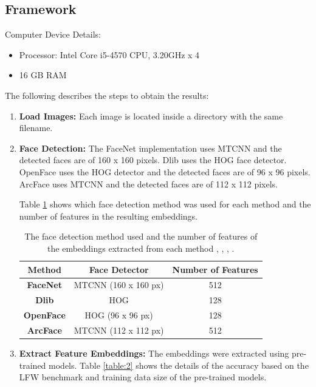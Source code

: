 \documentclass[12pt,english]{article}
\begin{document}
\subsection{Framework}
\quad
Computer Device Details:
\begin{itemize}
\item Processor: Intel Core i5-4570 CPU, 3.20GHz x 4
\item 16 GB RAM
\end{itemize}

The following describes the steps to obtain the results:

\begin{enumerate}
\item \textbf{Load Images: } Each image is located inside a directory with the same filename.
\item \textbf{Face Detection: } The FaceNet implementation uses MTCNN and the detected faces are of 160 x 160 pixels. Dlib uses the HOG face detector. OpenFace uses the HOG detector and the detected faces are of 96 x 96 pixels. ArcFace uses MTCNN and the detected faces are of 112 x 112 pixels.

Table \ref{table:1} shows which face detection method was used for each method and the number of features in the resulting embeddings.

\begin{table}[H]
\centering
\begin{tabular}{||c c c||} 
 \hline
  Method & Face Detector & Number of Features\\ [0.5ex]
 \hline\hline
 \textbf{FaceNet} & MTCNN (160 x 160 px) & 512\\ 
 \hline
 \textbf{Dlib} & HOG & 128\\
 \hline
 \textbf{OpenFace} & HOG (96 x 96 px) & 128\\
 \hline
 \textbf{ArcFace} & MTCNN (112 x 112 px) & 512\\
 \hline
\end{tabular}
\caption{The face detection method used and the number of features of the embeddings extracted from each method \cite{sandberg}, \cite{geitgey}, \cite{amos2016}, \cite{deng2019}.}
\label{table:1}
\end{table}

\item \textbf{Extract Feature Embeddings: } The embeddings were extracted using pre-trained models. Table \ref{table:2} shows the details of the accuracy based on the LFW benchmark and training data size of the pre-trained models.


\end{enumerate}
\end{document}
